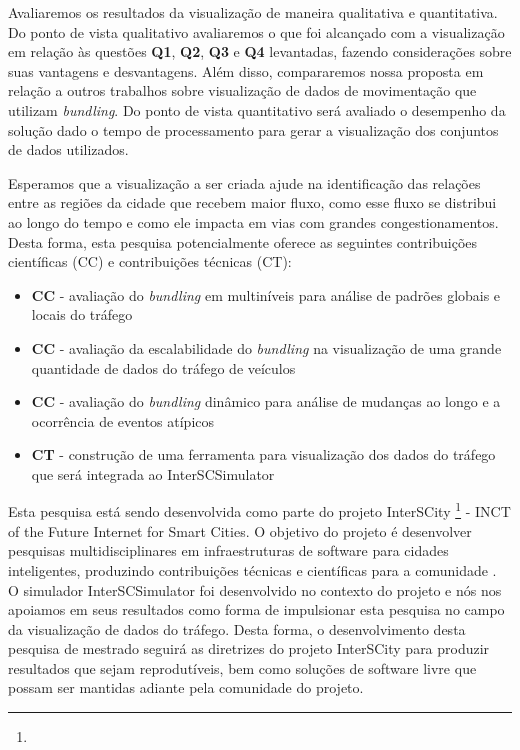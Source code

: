   Avaliaremos os resultados da visualização de maneira qualitativa e
quantitativa. Do ponto de vista qualitativo avaliaremos o que foi alcançado com
a visualização em relação às questões \textbf{Q1}, \textbf{Q2}, \textbf{Q3} e
\textbf{Q4} levantadas, fazendo considerações sobre suas vantagens e
desvantagens. Além disso, compararemos nossa proposta em relação a outros
trabalhos sobre visualização de dados de movimentação que utilizam
\emph{bundling}. Do ponto de vista quantitativo será avaliado o desempenho da
solução dado o tempo de processamento para gerar a visualização dos conjuntos
de dados utilizados.

  Esperamos que a visualização a ser criada ajude na identificação das relações
entre as regiões da cidade que recebem maior fluxo, como esse fluxo se
distribui ao longo do tempo e como ele impacta em vias com grandes
congestionamentos. Desta forma, esta pesquisa potencialmente oferece as
seguintes contribuições científicas (CC) e contribuições técnicas (CT):

\begin{itemize}
  \item \textbf{CC} - avaliação do \emph{bundling} em multiníveis para análise de
padrões globais e locais do tráfego

  \item \textbf{CC} - avaliação da escalabilidade do \emph{bundling} na visualização de uma grande
quantidade de dados do tráfego de veículos

  \item \textbf{CC} - avaliação do \emph{bundling} dinâmico para análise de mudanças ao longo
e a ocorrência de eventos atípicos

  \item \textbf{CT} - construção de uma ferramenta para visualização dos dados do tráfego
que será integrada ao InterSCSimulator
\end{itemize}

Esta pesquisa está sendo desenvolvida como parte do projeto InterSCity
\footnote{} - INCT of the Future Internet for Smart
Cities. O objetivo do projeto é desenvolver pesquisas multidisciplinares em
infraestruturas de software para cidades inteligentes, produzindo contribuições
técnicas e científicas para a comunidade \citep{Daniel2016}. O simulador InterSCSimulator foi
desenvolvido no contexto do projeto e nós nos apoiamos em seus resultados como
forma de impulsionar esta pesquisa no campo da visualização de dados do
tráfego. Desta forma, o desenvolvimento desta pesquisa de mestrado seguirá as
diretrizes do projeto InterSCity para produzir resultados que sejam
reprodutíveis, bem como soluções de software livre que possam ser mantidas
adiante pela comunidade do projeto.
